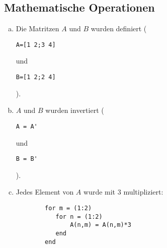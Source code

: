 \subsection{Mathematische Operationen}

\begin{enumerate}[a)]
    \item Die Matritzen $A$ und $B$ wurden definiert (\begin{verbatim}A=[1 2;3 4]\end{verbatim} und \begin{verbatim}B=[1 2;2 4]\end{verbatim}).
    \item $A$ und $B$ wurden invertiert (\begin{verbatim}A = A'\end{verbatim} und \begin{verbatim}B = B'\end{verbatim}).
    \item Jedes Element von $A$ wurde mit $3$ multipliziert:\\
    \begin{verbatim}
        for m = (1:2)
           for n = (1:2)
               A(n,m) = A(n,m)*3
           end
        end
    \end{verbatim}
\end{enumerate}